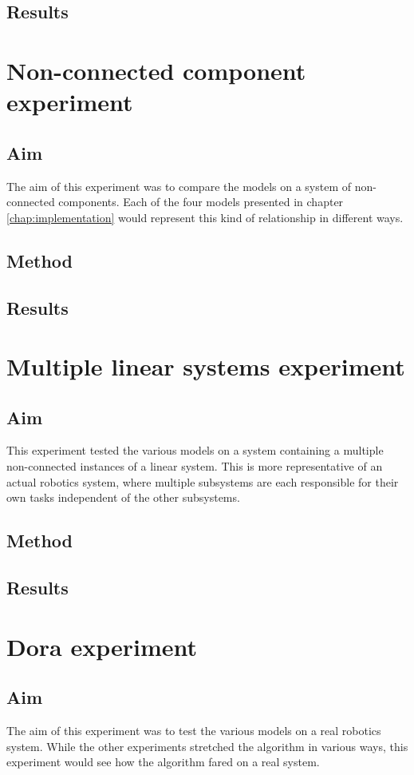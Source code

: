 \subsection{Results}

\section{Non-connected component experiment}
\subsection{Aim}
The aim of this experiment was to compare the models on a system of
non-connected components. Each of the four models presented in chapter
\ref{chap:implementation} would represent this kind of relationship in
different ways.

\subsection{Method}
\subsection{Results}

\section{Multiple linear systems experiment}
\subsection{Aim}
This experiment tested the various models on a system containing a
multiple non-connected instances of a linear system. This is more
representative of an actual robotics system, where multiple subsystems
are each responsible for their own tasks independent of the other
subsystems.

\subsection{Method}
\subsection{Results}

\section{Dora experiment}
\subsection{Aim}
The aim of this experiment was to test the various models on a real
robotics system. While the other experiments stretched the algorithm
in various ways, this experiment would see how the algorithm fared on
a real system.

